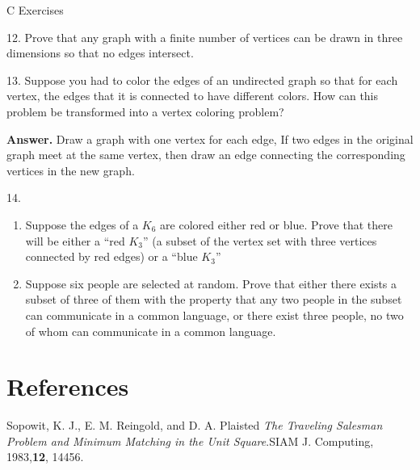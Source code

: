\documentclass[10pt,]{book}
\theoremstyle{plain}
\theoremstyle{definition}
\theoremstyle{definition}
\theoremstyle{definition}
\theoremstyle{definition}
\theoremstyle{definition}
\numberwithin{equation}{section}
\begin{document}
\hypertarget{exercisegroup-12}{}\typeout{************************************************}
\typeout{************************************************}
C Exercises%
\begin{exercisegroup}
\item[12.]\hypertarget{exercise-53}{}Prove that any graph with a finite number of vertices can be drawn in three dimensions so that no edges intersect.%
\par\smallskip
\item[13.]\hypertarget{exercise-54}{}Suppose you had to color the edges of an undirected graph so that for each vertex, the edges that it is connected to have different colors.
How can this problem be transformed into a vertex coloring problem?%
\par\smallskip
\par\smallskip
\noindent\textbf{Answer.}\hypertarget{answer-22}{}\quad
 Draw a graph with one vertex for each edge, If two edges in the original graph meet at the same vertex, then draw an edge connecting the corresponding  vertices in the new graph.%
\item[14.]\hypertarget{exercise-55}{}\leavevmode%
\begin{enumerate}[label=\alph*]
\item\hypertarget{li-140}{}Suppose the edges of a \(K_6\) are colored either red or blue. Prove that there will be either a ``red \(K_3\)'' (a subset
of the vertex set with three vertices connected by red edges) or a ``blue \(K_3\)'' %
\item\hypertarget{li-141}{} Suppose six people are selected at random. Prove that either there exists a subset of three of them with the property that any two people in
the subset can communicate in a common language, or there exist three people, no two of whom can communicate in a common language.
%
\end{enumerate}
%
\par\smallskip
\end{exercisegroup}
\par\smallskip\noindent
%
\backmatter
%
%
%
\typeout{************************************************}
\typeout{************************************************}
\chapter[References]{References}\label{references-1}
\begin{referencelist}
\hypertarget{biblio-sopowit-1983}{}Sopowit, K. J., E. M. Reingold, and D. A. Plaisted \textit{The Traveling Salesman Problem and Minimum Matching in the Unit Square}.SIAM J. Computing, 1983,\textbf{12}, 144\textendash{}56.
\end{referencelist}
%
\printindex
%
\end{document}
